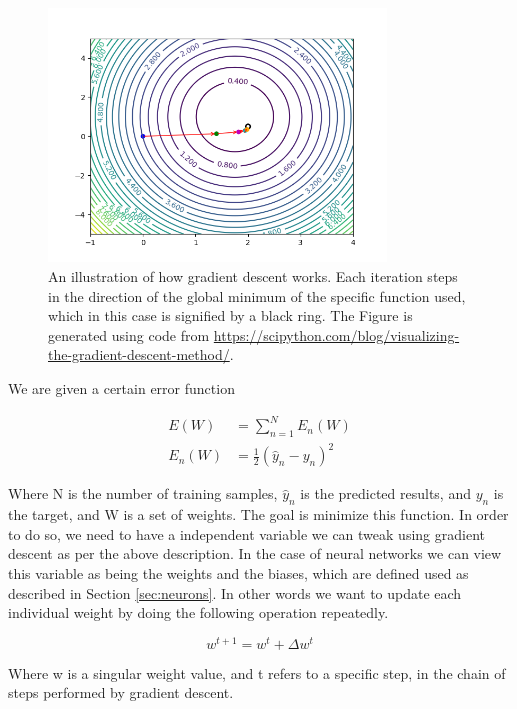 \begin{figure}
    \centering
    \includegraphics[width=0.8\textwidth]{./pictures/method/GradientDesc.png}
    \caption{An illustration of how gradient descent works. Each iteration steps
        in the direction of the global minimum of the specific function used,
        which in this case is signified by a black ring. The Figure is generated
        using code from
        \url{https://scipython.com/blog/visualizing-the-gradient-descent-method/}.}
    \label{fig:grad}
\end{figure}

We are given a certain error function

\begin{align}
E(W) &= \sum_{n=1}^N E_n(W)\\
E_n(W) &= \frac{1}{2}(\hat{y}_n - y_n)^2
\end{align}

Where N is the number of training samples, $\hat{y}_n$ is the predicted results,
and $y_n$ is the target, and W is a set of weights. The goal is minimize this
function. In order to do so, we need to have a independent variable we can
tweak using gradient descent as per the above description. In the case of neural
networks we can view this variable as being the weights and the biases, which
are defined used as described in Section \ref{sec:neurons}. In other words
we want to update each individual weight by doing the following operation
repeatedly.

\begin{equation}\label{eq:update}
w^{t+1} = w^t + \Delta w^t
\end{equation}

Where w is a singular weight value, and t refers to a specific step, in the
chain of steps performed by gradient descent.


